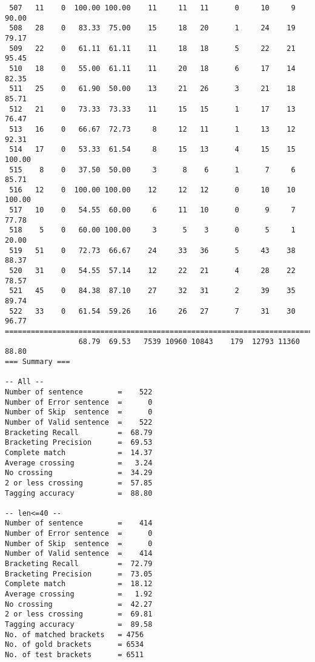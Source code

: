 \begin{verbatim}
 507   11    0  100.00 100.00    11     11   11      0     10     9    90.00
 508   28    0   83.33  75.00    15     18   20      1     24    19    79.17
 509   22    0   61.11  61.11    11     18   18      5     22    21    95.45
 510   18    0   55.00  61.11    11     20   18      6     17    14    82.35
 511   25    0   61.90  50.00    13     21   26      3     21    18    85.71
 512   21    0   73.33  73.33    11     15   15      1     17    13    76.47
 513   16    0   66.67  72.73     8     12   11      1     13    12    92.31
 514   17    0   53.33  61.54     8     15   13      4     15    15   100.00
 515    8    0   37.50  50.00     3      8    6      1      7     6    85.71
 516   12    0  100.00 100.00    12     12   12      0     10    10   100.00
 517   10    0   54.55  60.00     6     11   10      0      9     7    77.78
 518    5    0   60.00 100.00     3      5    3      0      5     1    20.00
 519   51    0   72.73  66.67    24     33   36      5     43    38    88.37
 520   31    0   54.55  57.14    12     22   21      4     28    22    78.57
 521   45    0   84.38  87.10    27     32   31      2     39    35    89.74
 522   33    0   61.54  59.26    16     26   27      7     31    30    96.77
============================================================================
                 68.79  69.53   7539 10960 10843    179  12793 11360    88.80
=== Summary ===

-- All --
Number of sentence        =    522
Number of Error sentence  =      0
Number of Skip  sentence  =      0
Number of Valid sentence  =    522
Bracketing Recall         =  68.79
Bracketing Precision      =  69.53
Complete match            =  14.37
Average crossing          =   3.24
No crossing               =  34.29
2 or less crossing        =  57.85
Tagging accuracy          =  88.80

-- len<=40 --
Number of sentence        =    414
Number of Error sentence  =      0
Number of Skip  sentence  =      0
Number of Valid sentence  =    414
Bracketing Recall         =  72.79
Bracketing Precision      =  73.05
Complete match            =  18.12
Average crossing          =   1.92
No crossing               =  42.27
2 or less crossing        =  69.81
Tagging accuracy          =  89.58
No. of matched brackets   = 4756
No. of gold brackets      = 6534
No. of test brackets      = 6511

\end{verbatim}

\normalsize


